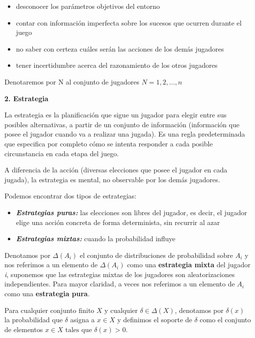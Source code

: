\documentclass[12pt,a4paper,]{book}
\numberwithin{dummy}{section}
\theoremstyle{ocrenumbox}
\theoremstyle{blacknumex}
\theoremstyle{blacknumbox}
\theoremstyle{ocrenum}
\theoremstyle{ocrenum}
\begin{document}
\begin{itemize}
\item
  desconocer los parámetros objetivos del entorno
\item
  contar con información imperfecta sobre los sucesos que ocurren
  durante el juego
\item
  no saber con certeza cuáles serán las acciones de los demás jugadores
\item
  tener incertidumbre acerca del razonamiento de los otros jugadores
\end{itemize}

Denotaremos por N al conjunto de jugadores \(N = {1,2,...,n}\)

\textbf{2. Estrategia}

La estrategia es la planificación que sigue un jugador para elegir entre
sus posibles alternativas, a partir de un conjunto de información
(información que posee el jugador cuando va a realizar una jugada). Es
una regla predeterminada que especifica por completo cómo se intenta
responder a cada posible circunstancia en cada etapa del juego.

A diferencia de la acción (diversas elecciones que posee el jugador en
cada jugada), la estrategia es mental, no observable por los demás
jugadores.

Podemos encontrar dos tipos de estrategias:

\begin{itemize}
\item
  \textbf{\emph{Estrategias puras:}} las elecciones son libres del
  jugador, es decir, el jugador elige una acción concreta de forma
  determinista, sin recurrir al azar
\item
  \textbf{\emph{Estrategias mixtas:}} cuando la probabilidad influye
\end{itemize}

Denotamos por \(\Delta({A_i})\) el conjunto de distribuciones de
probabilidad sobre \(A_i\) y nos referimos a un elemento de
\(\Delta({A_i})\) como una \textbf{estrategia mixta} del jugador
\emph{i}, suponemos que las estrategias mixtas de los jugadores son
aleatorizaciones independientes. Para mayor claridad, a veces nos
referimos a un elemento de \(A_i\) como una \textbf{estrategia pura}.

Para cualquier conjunto finito \(X\) y cualquier
\(\delta \in \Delta(X)\), denotamos por \(\delta(x)\) la probabilidad
que \(\delta\) asigna a \(x \in X\) y definimos el soporte de \(\delta\)
como el conjunto de elementos
\(x \in X \,\, \mbox{tales que} \,\, \delta(x) > 0\).
\end{document}
